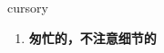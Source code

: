 
\begin{frame}
{\huge cursory}
\begin{center}
\begin{enumerate}\Large
  \item \textbf{匆忙的，不注意细节的}
\end{enumerate}
\end{center}
\end{frame}

